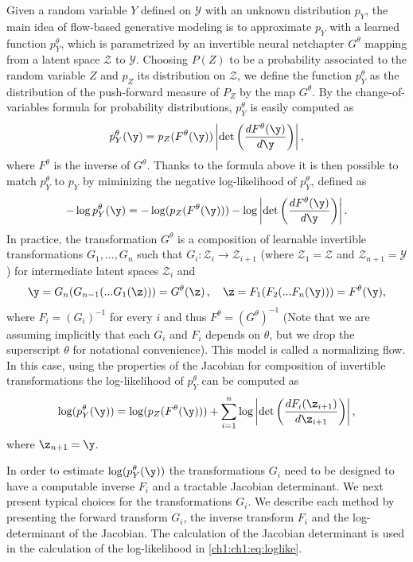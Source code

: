 Given a random variable $Y$ defined on $\mathcal{Y}$ with an unknown distribution $p_Y$, the main idea of flow-based generative modeling is to approximate $p_Y$ with a learned function $p^\theta_Y$, which is parametrized by an invertible neural netchapter $G^\theta$ mapping from a latent space $\mathcal{Z}$ to $\mathcal{Y}$. 
Choosing $P(Z)$ to be a probability associated to the random variable $Z$ and $p_Z$ its distribution on $\mathcal{Z}$, we define the function $p^\theta_Y$ as the distribution of the push-forward measure of $P_Z$ by the map $G^\theta$.
By the change-of-variables formula for probability distributions, $p^\theta_Y$ is easily computed as
\begin{align*}
p^\theta_Y(\y) = p_Z(F^\theta(\y)) \left| \det \left(\frac{d F^\theta(\y)}{d\y} \right)\right|,
\end{align*}
where $F^\theta$ is the inverse of $G^\theta$.
Thanks to the formula above it is then possible to match $p^\theta_Y$ to $p_Y$ by miminizing the negative log-likelihood of $p^\theta_Y$, defined as
\begin{align*}
- \log p^\theta_Y(\y) = -  \log(p_Z(F^\theta(\y))) -  \log\left| \det \left(\frac{d F^\theta(\y)}{d\y} \right)\right|.
\end{align*}
In practice, the transformation $G^\theta$ is a composition of learnable invertible transformations $G_{1}, ..., G_{n}$ such that $G_i : \mathcal{Z}_{i} \rightarrow \mathcal{Z}_{i+1}$ (where $\mathcal{Z}_1 = \mathcal{Z}$ and $\mathcal{Z}_{n+1} = \mathcal{Y}$) for intermediate latent spaces $\mathcal{Z}_i$ and
\begin{equation}
    \y = G_{n}(G_{n-1}(...G_{1}(\z)))=G^{\theta}(\z)\,, \quad  \z= F_1(F_{2}(...F_n(\y)))=F^{\theta}(\y),
\end{equation}
where $F_i = (G_i)^{-1}$ for every $i$ and thus $F^\theta = (G^\theta)^{-1}$ (Note that we are assuming implicitly that each $G_i$ and $F_i$ depends on $\theta$, but we drop the superscript $\theta$ for notational convenience). This model is called a normalizing flow.
In this case, using the properties of the Jacobian for composition of invertible transformations the log-likelihood of $p^\theta_Y$ can be computed as 
\begin{equation}\label{ch1:ch1:eq:loglike}
\log(p^\theta_Y(\y) ) = \log(p_Z(F^\theta(\y))) + \sum_{i=1}^{n}  \log\left| \det \left(\frac{d{F_i}(\z_{i+1})}{d\z_{i+1}} \right)\right|,
\end{equation}
where $\z_{n+1} = \y$.


In order to estimate $\log(p^\theta_Y(\y) )$ the transformations $G_i$ need to be designed to have a computable inverse $F_i$ and a tractable Jacobian determinant. 
We next present typical choices for the transformations $G_i$. We describe each method by presenting the forward transform $G_i$, the inverse transform $F_i$ and the  log-determinant of the Jacobian. The calculation of the Jacobian determinant is used in the calculation of the log-likelihood in \eqref{ch1:ch1:eq:loglike}.
\color{black}

